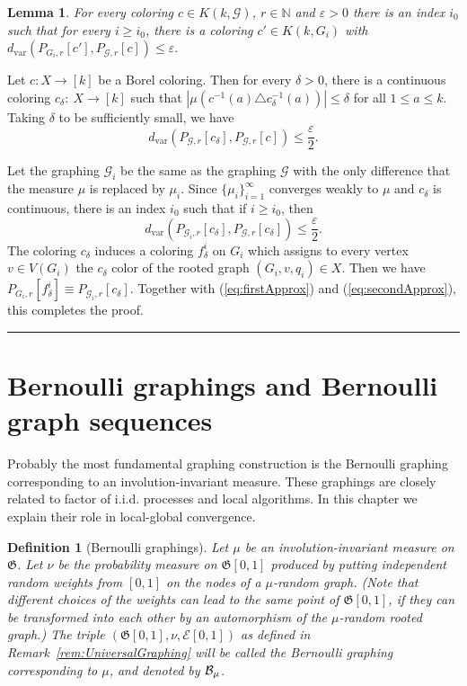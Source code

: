 \documentclass{article}
\newtheorem{lemma}[theorem]{Lemma}
\newtheorem{definition}[theorem]{Definition}
\newenvironment{proof}{{\bf Proof.}}{\hfill\rule{2mm}{2mm}\medskip}
\def\GG{\mathcal{G}}\def\HH{\mathcal{H}}\def\II{\mathcal{I}}
\def\Gf{\mathfrak{G}}\def\Hf{\mathfrak{H}}\def\If{\mathfrak{I}}
\def\eps{\varepsilon}
\newcommand{\dvar}{{d_{\mathrm{var}}}}
\begin{document}
\begin{lemma}
For every coloring $c\in K(k,\GG)$, $r\in\mathbb{N}$ and {$\eps>0$}
there is an index $i_0$ such that for every $i\geq i_0$, there is a
coloring $c'\in K(k,G_i)$ with $\dvar( P_{G_i,r}[c'], P_{\GG,r}[c])
\le\eps.$
\end{lemma}

\begin{proof}
Let $c:X\rightarrow [k]$ be a Borel coloring. Then for every
$\delta>0$, there is a continuous coloring $c_\delta:~X\rightarrow
[k]$ such that $|\mu(c^{-1}(a) \triangle
c_\delta^{-1}(a))|\leq\delta$  for all $1\leq a\leq k$. Taking
$\delta$ to be sufficiently small, we have
\begin{equation} \label{eq:firstApprox}
\dvar( P_{\GG,r}[c_\delta],P_{\GG,r}[c]) \le \frac{\eps}{2}.
\end{equation}

Let the graphing $\GG_i$ be the same as the graphing $\GG$ with the
only difference that the measure $\mu$ is replaced by $\mu_i$. Since
$\{\mu_i\}_{i=1}^\infty$ converges weakly to $\mu$ and $c_\delta$ is
continuous, there is an index $i_0$ such that if $i \geq i_0$, then
\begin{equation} \label{eq:secondApprox}
\dvar(P_{\GG_i,r}[c_\delta], P_{\GG,r}[c_\delta] ) \le \frac{\eps}{2}.
\end{equation}
The coloring $c_\delta$ induces a coloring $f^i_\delta$ on $G_i$
which assigns to every vertex $v\in V(G_i)$ the $c_\delta$ color of
the rooted graph $(G_i,v,q_i)\in X$. Then we have
$P_{G_i,r}[f^i_\delta] \equiv P_{\GG_i,r}[c_\delta]$. {Together with
(\ref{eq:firstApprox}) and (\ref{eq:secondApprox}), this completes
the proof.}
\end{proof}

\section{Bernoulli graphings and Bernoulli graph
sequences}\label{SEC:BERN}

Probably the most fundamental graphing construction is the Bernoulli
graphing corresponding to an involution-invariant measure. These
graphings are closely related to factor of i.i.d. processes and local
algorithms. In this chapter we explain their role in local-global
convergence.

\begin{definition}[Bernoulli graphings]
Let $\mu$ be an involution-invariant measure on $\Gf$. Let $\nu$ be
the probability measure on $\Gf[0,1]$ produced by putting independent
random {weights} from $[0,1]$ on the nodes of a $\mu$-random graph.
(Note that different choices of the weights can lead to the same
point of $\Gf[0,1]$, if they can be transformed into each other by an
automorphism of the $\mu$-random rooted graph.) The triple
$(\Gf[0,1],\nu,\mathcal{E}[0,1])$ as defined in
Remark~\ref{rem:UniversalGraphing} will be called the \emph{Bernoulli
graphing} corresponding to $\mu$, and denoted by $\mathcal{B}_\mu$.
\end{definition}
\end{document}
